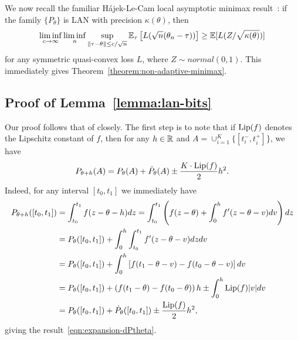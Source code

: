 We now recall the familiar H\'{a}jek-Le-Cam local asymptotic minimax
result~\cite[Thm.~8.11]{VanDerVaart98}: if the family
$\{P_\theta\}$ is LAN with precision $\kappa(\theta)$, then
\begin{equation*}
  \liminf_{c \to \infty} \liminf_n \sup_{\left\|{\tau - \theta}\right\| \le
    c / \sqrt{n}} \mathbb{E}_\tau\left[L(\sqrt{n}(\theta_n - \tau))\right]
  \ge \mathbb{E}[L(Z / \sqrt{\kappa(\theta)})]
\end{equation*}
for any symmetric quasi-convex loss $L$, where $Z \sim normal(0, 1)$.
This immediately gives Theorem~\ref{theorem:non-adaptive-minimax}.

\subsection{Proof of Lemma~\ref{lemma:lan-bits}}
\label{sec:proof-lan-bits}

Our proof follows that of \cite[Thm.~7.2]{VanDerVaart98} closely.
The first step is to note that
if ${\rm \textup{Lip}}(f)$ denotes the Lipschitz constant of $f$, then for any
$h \in \mathbb{R}$ and $A = \cup_{i = 1}^K \{[t_i^-, t_i^+]\}$, we have
\begin{equation}
  \label{eqn:expansion-dPtheta}
  P_{\theta + h}(A) = P_\theta(A) + \dot{P}_\theta(A)
  \pm \frac{K \cdot {\rm \textup{Lip}}(f)}{2}  h^2.
\end{equation}
Indeed, for any interval $[t_0, t_1]$ we immediately have
\begin{align*}
  P_{\theta + h}([t_0, t_1])
  & = \int_{t_0}^{t_1} f(z - \theta - h) dz
  = \int_{t_0}^{t_1} \left(f(z - \theta)
  + \int_0^h f'(z - \theta - v) dv\right) dz \\
  & = P_\theta([t_0, t_1])
  + \int_0^h \int_{t_0}^{t_1} f'(z - \theta - v) dz dv \\
  & = P_\theta([t_0, t_1])
  + \int_0^h \left[f(t_1 - \theta - v) - f(t_0 - \theta - v)\right] dv \\
  & = P_\theta([t_0, t_1])
  + \left(f(t_1 - \theta) - f(t_0 - \theta)\right) h
  \pm \int_0^h {\rm \textup{Lip}}(f) |v| dv \\
  & = P_\theta([t_0, t_1]) + \dot{P}_\theta([t_0, t_1])
  \pm \frac{{\rm \textup{Lip}}(f)}{2} h^2,
\end{align*}
giving the result~\eqref{eqn:expansion-dPtheta}.

